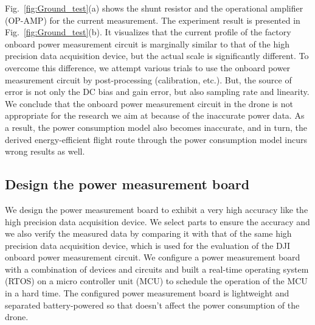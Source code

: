\documentclass[journal]{./template/IEEEtran}
\begin{document}
Fig.~\ref{fig:Ground_test}(a) shows the shunt resistor and the operational amplifier (OP-AMP) for the current measurement. 
The experiment result is presented in Fig.~\ref{fig:Ground_test}(b). 
It visualizes that the current profile of the factory onboard power measurement circuit is marginally similar to that of the high precision data acquisition device, but the actual scale is significantly different. 
To overcome this difference, we attempt various trials to use the onboard power measurement circuit by post-processing (calibration, etc.). But, the source of error is not only the DC bias and gain error, but also sampling rate and linearity. 
We conclude that the onboard power measurement circuit in the drone is not appropriate for the research we aim at because of the inaccurate power data. 
As a result, the power consumption model also becomes inaccurate, and in turn, the derived energy-efficient flight route through the power consumption model incurs wrong results as well.





\subsection{Design the power measurement board}
We design the power measurement board to exhibit a very high accuracy like the high precision data acquisition device.
We select parts to ensure the accuracy and we also verify the measured data by comparing it with that of the same high precision data acquisition device, which is used for the evaluation of the DJI onboard power measurement circuit.
We configure a power measurement board with a combination of devices and circuits and built a real-time operating system (RTOS) on a micro controller unit (MCU) to schedule the operation of the MCU in a hard time. 
The configured power measurement board is lightweight and separated battery-powered so that doesn't affect the power consumption of the drone.
\end{document}
